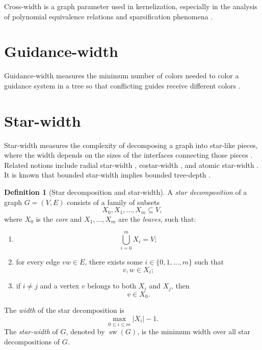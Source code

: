 \documentclass[10pt]{book}
\theoremstyle{definition}
\newtheorem{definition}[theorem]{Definition}
\begin{document}
Cross-width is a graph parameter used in kernelization, especially in the analysis of polynomial equivalence relations and sparsification phenomena \cite{jansen2015sparsification}.

\section{Guidance-width}

Guidance-width measures the minimum number of colors needed to color a guidance system in a tree so that conflicting guides receive different colors \cite{bojanczyk2012extension}.

\section{Star-width}

Star-width measures the complexity of decomposing a graph into star-like pieces, where the width depends on the sizes of the interfaces connecting those pieces \cite{blume2011treewidth,van2017some,van2017routing}.  
Related notions include radial star-width \cite{albrechtsen2023structural}, costar-width \cite{blume2011treewidth}, and atomic star-width \cite{blume2011treewidth}.  
It is known that bounded star-width implies bounded tree-depth \cite{van2017routing}.

\begin{definition}[Star decomposition and star-width]
\cite{van2017some,van2017routing}
A \emph{star decomposition} of a graph \(G=(V,E)\) consists of a family of subsets
\[
X_0,X_1,\dots,X_m\subseteq V,
\]
where \(X_0\) is the \emph{core} and \(X_1,\dots,X_m\) are the \emph{leaves}, such that:
\begin{enumerate}
    \item
    \[
    \bigcup_{i=0}^m X_i = V;
    \]
    \item for every edge \(vw\in E\), there exists some \(i\in \{0,1,\dots,m\}\) such that
    \[
    v,w\in X_i;
    \]
    \item if \(i\neq j\) and a vertex \(v\) belongs to both \(X_i\) and \(X_j\), then
    \[
    v\in X_0.
    \]
\end{enumerate}

The \emph{width} of the star decomposition is
\[
\max_{0\leq i\leq m} |X_i|-1.
\]
The \emph{star-width} of \(G\), denoted by \(\operatorname{sw}(G)\), is the minimum width over all star decompositions of \(G\).
\end{definition}
\end{document}
